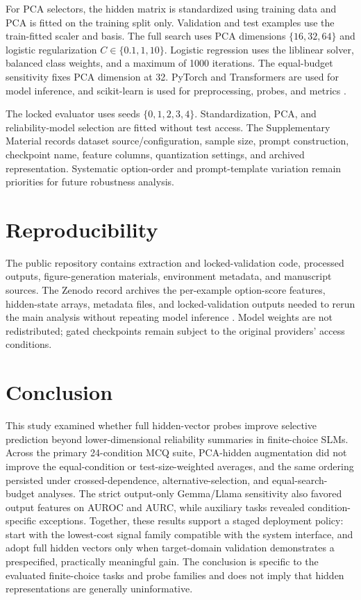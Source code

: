 \documentclass[preprint,12pt,authoryear]{elsarticle}
\begin{document}
For PCA selectors, the hidden matrix is standardized using training data and PCA is fitted on the training split only. Validation and test examples use the train-fitted scaler and basis. The full search uses PCA dimensions $\{16,32,64\}$ and logistic regularization $C\in\{0.1,1,10\}$. Logistic regression uses the liblinear solver, balanced class weights, and a maximum of 1000 iterations. The equal-budget sensitivity fixes PCA dimension at 32. PyTorch and Transformers are used for model inference, and scikit-learn is used for preprocessing, probes, and metrics \citep{pedregosa2011sklearn,paszke2019pytorch,wolf2020transformers}.

The locked evaluator uses seeds $\{0,1,2,3,4\}$. Standardization, PCA, and reliability-model selection are fitted without test access. The Supplementary Material records dataset source/configuration, sample size, prompt construction, checkpoint name, feature columns, quantization settings, and archived representation. Systematic option-order and prompt-template variation remain priorities for future robustness analysis.

\section{Reproducibility}

\FloatBarrier
The public repository contains extraction and locked-validation code, processed outputs, figure-generation materials, environment metadata, and manuscript sources. The Zenodo record archives the per-example option-score features, hidden-state arrays, metadata files, and locked-validation outputs needed to rerun the main analysis without repeating model inference \citep{nazim2026artifact}. Model weights are not redistributed; gated checkpoints remain subject to the original providers' access conditions.

\FloatBarrier
\section{Conclusion}
This study examined whether full hidden-vector probes improve selective prediction beyond lower-dimensional reliability summaries in finite-choice SLMs. Across the primary 24-condition MCQ suite, PCA-hidden augmentation did not improve the equal-condition or test-size-weighted averages, and the same ordering persisted under crossed-dependence, alternative-selection, and equal-search-budget analyses. The strict output-only Gemma/Llama sensitivity also favored output features on AUROC and AURC, while auxiliary tasks revealed condition-specific exceptions. Together, these results support a staged deployment policy: start with the lowest-cost signal family compatible with the system interface, and adopt full hidden vectors only when target-domain validation demonstrates a prespecified, practically meaningful gain. The conclusion is specific to the evaluated finite-choice tasks and probe families and does not imply that hidden representations are generally uninformative.
\end{document}
